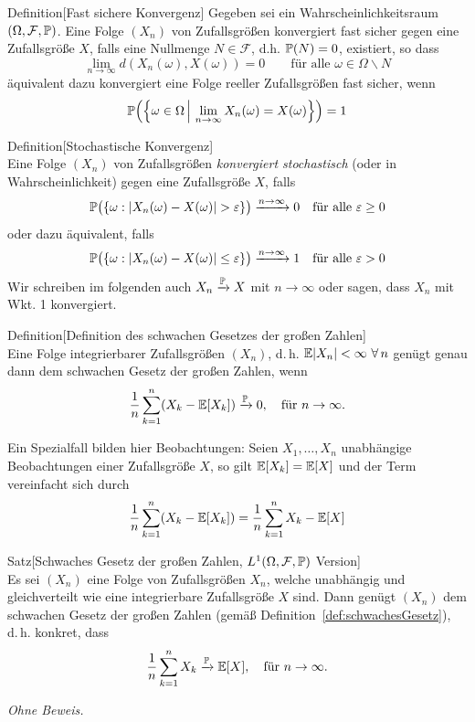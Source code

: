 \begin{colbox}{Definition}[Fast sichere Konvergenz]
    Gegeben sei ein Wahrscheinlichkeitsraum $(\Omega, \mathcal{F}, \P)$. Eine Folge $(X_n)$ von Zufallsgrößen 
    konvergiert fast sicher gegen eine Zufallsgröße $X$, falls eine Nullmenge $N\in\mathcal{F}$, d.h. $\P(N)=0$, 
    existiert, so dass 
    \[
        \lim_{n\to\infty} d(X_n(\omega), X(\omega)) = 0 \qquad \text{für alle }\omega \in \Omega\backslash N
    \]
    äquivalent dazu konvergiert eine Folge reeller Zufallsgrößen fast sicher, wenn 
    \[
        \P\Big(\Big\{\omega\in\Omega\,\Big|\,\lim_{n\to\infty} X_n(\omega)= X(\omega) \Big\}\Big) = 1
    \] 
\end{colbox}

\begin{colbox}{Definition}[Stochastische Konvergenz]\ \\
    Eine Folge $(X_n)$ von Zufallsgrößen \emph{konvergiert stochastisch} (oder in Wahrscheinlichkeit) gegen eine 
    Zufallsgröße $X$, falls
    \[
    \P\big(\{\omega:|X_n(\omega)-X(\omega)|>\epsilon\}\big) 
    \xrightarrow{n\to\infty} 0\quad\text{für alle }\epsilon \geq 0
    \]
    oder dazu äquivalent, falls
    \[
    \P\big(\{\omega:|X_n(\omega)-X(\omega)|\leq\epsilon\}\big) 
    \xrightarrow{n\to\infty} 1\quad\text{für alle } \epsilon > 0
    \]
    Wir schreiben im folgenden auch $X_n\conP X$ mit $n\to\infty$ oder sagen, dass $X_n$ mit Wkt. 1 konvergiert.
\end{colbox}
\begin{colbox}{Definition}[Definition des schwachen Gesetzes der großen Zahlen]\label{def:schwachesGesetz}\ \\
    Eine Folge integrierbarer Zufallsgrößen $(X_n)$, d.\,h. $\E|X_n|<\infty\ \forall\,n$ genügt genau dann
    dem schwachen Gesetz der großen Zahlen, wenn
    \[
    \frac{1}{n}\sum_{k=1}^{n}(X_k-\E[X_k]) \conP 0,\quad\text{für }n\to\infty.
    \]
\end{colbox}
Ein Spezialfall bilden hier Beobachtungen: Seien $X_1,\dotsc,X_n$ unabhängige Beobachtungen einer Zufallsgröße $X$, 
so gilt $\E[X_k]=\E[X]$ und der Term vereinfacht sich durch
\[
\frac{1}{n}\sum_{k=1}^{n}(X_k-\E[X_k]) = \frac{1}{n}\sum_{k=1}^{n}X_k-\E[X]
\]
\begin{colbox}{Satz}[Schwaches Gesetz der großen Zahlen, $L^1(\Omega,\mathcal{F},\P)$ Version]\ \\
    Es sei $(X_n)$ eine Folge von Zufallsgrößen $X_n$, welche unabhängig und gleichverteilt wie eine integrierbare
    Zufallsgröße $X$ sind. 
    Dann genügt $(X_n)$ dem schwachen Gesetz der großen Zahlen (gemäß Definition~\ref{def:schwachesGesetz}), 
    d.\,h. konkret, dass
    \[
    \frac{1}{n}\sum_{k=1}^{n} X_k \conP \E[X], \quad \text{für } n \to \infty.
    \]
\end{colbox}
\textit{Ohne Beweis.}\\

